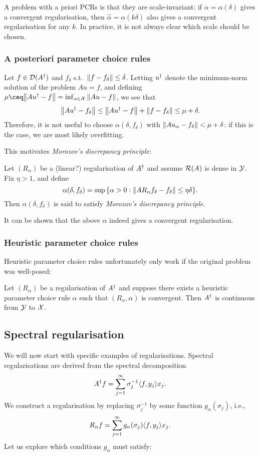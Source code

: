 A problem with a priori PCRs is that they are scale-invariant: if $\alpha = \alpha(\delta)$ gives a convergent regularisation, then $\hat\alpha = \alpha(k\delta)$ also gives a convergent regularisation for any $k$. In practice, it is not always clear which scale should be chosen.

\subsubsection{A posteriori parameter choice rules}
Let $f \in \operatorname{\mathcal D}(A^\dagger)$ and $f_\delta$ s.t.\ $\norm{f- f_\delta} \leq \delta$. Letting $u^\dagger$ denote the minimum-norm solution of the problem $Au = f$, and defining $\mu \ceq \norm{Au\D - f} = \inf_{u \in \XX} \norm{Au - f}$, we see that
\[
\norm{Au^\dagger - f_\delta} \leq \norm{Au^\dagger - f} + \norm{f - f_\delta} \leq \mu + \delta. 
\]
Therefore, it is not useful to choose $\alpha(\delta, f_\delta)$ with $\norm{Au_\alpha - f_\delta} < \mu + \delta$: if this is the case, we are most likely overfitting. 

This motivates \emph{Morozov's discrepancy principle}: 

\begin{definition}
	Let $(R_\alpha)$ be a (\TODO linear?) regularisation of $A^\dagger$ and assume $\operatorname{\mathcal R}(A)$ is dense in $\mathcal Y$. Fix $\eta > 1$, and define
	\[
	\alpha(\delta, f_\delta) = \sup\qty{\alpha > 0 : \norm{A R_{\alpha} f_\delta - f_\delta} \leq \eta\delta}.
	\]
	Then $\alpha(\delta, f_\delta)$ is said to satisfy \emph{Morozov's discrepancy principle}. 
\end{definition}

It can be shown that the above $\alpha$ indeed gives a convergent regularisation.

\subsubsection{Heuristic parameter choice rules}
Heuristic parameter choice rules unfortunately only work if the original problem was well-posed:
\begin{theorem}[Bakushinskii]
	Let $(R_\alpha)$ be a regularisation of $A^\dagger$ and suppose there exists a heuristic parameter choice rule $\alpha$ such that $(R_\alpha, \alpha)$ is convergent. Then $A^\dagger$ is continuous from $\mathcal Y$ to $\mathcal X$. 
\end{theorem}

\subsection{Spectral regularisation}
We will now start with specific examples of regularisations. Spectral regularisations are derived from the spectral decomposition
\[
A^\dagger f = \sum_{j=1}^\infty \sigma_j^{-1} \langle f, y_j\rangle x_j. 
\]
We construct a regularisation by replacing $\sigma_j^{-1}$ by some function $g_\alpha(\sigma_j)$, i.e.,
\begin{equation} \label{eq:spectral_reg}
R_\alpha f = \sum_{j=1}^\infty g_\alpha(\sigma_j) \langle f, y_j\rangle x_j. 
\end{equation}
Let us explore which conditions $g_\alpha$ must satisfy: 


